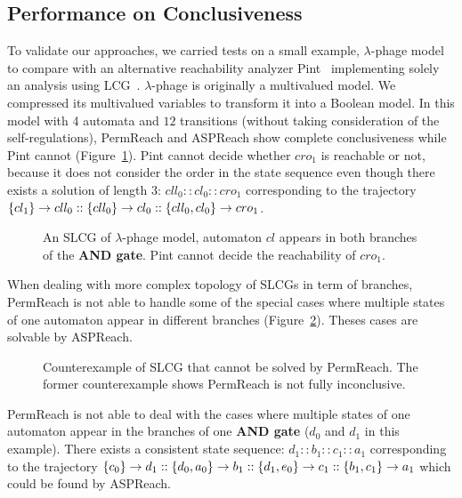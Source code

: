 \subsection{Performance on Conclusiveness}
To validate our approaches, we carried tests on a small example, $\lambda$-phage model~\cite{thieffry1995dynamical} to compare with an alternative reachability analyzer Pint~\cite{pauleve2012} implementing solely an analysis using LCG~\cite{pauleve2017reduction,folschette2015,pauleve2011}.
$\lambda$-phage is originally a multivalued model.
We compressed its multivalued variables to transform it into a Boolean model.
In this model with 4 automata and $12$ transitions (without taking consideration of the self-regulations),
PermReach and ASPReach show complete conclusiveness while Pint cannot (Figure~\ref{fig:LCG_lambdaPhage}). %
Pint cannot decide whether $cro_1$ is reachable or not, because it does not consider the order in the state sequence even though there exists a solution of length 3: $cll_0::cl_0::cro_1$ corresponding to the trajectory $\acm{cl_1}{cll_1}{cll_0}::\acm{cll_0}{cl_1}{cl_0}::\acm{cll_0,cl_0}{cro_0}{cro_1}$.
\begin{figure}[ht]
\centering
    
    \caption[SLCG of $\lambda$-phage model]{An SLCG of $\lambda$-phage model, automaton $cl$ appears in both branches of the \textbf{AND gate}.
    Pint cannot decide the reachability of $cro_1$.}
    \label{fig:LCG_lambdaPhage}
\end{figure}

When dealing with more complex topology of SLCGs in term of branches, PermReach is not able to handle some of the special cases where multiple states of one automaton appear in different branches (Figure~\ref{fig:countexPerm}).
Theses cases are solvable by \mbox{ASPReach}.

\begin{figure}[ht]
    \centering
    
    \caption[Counterexample of PermReach]{Counterexample of SLCG that cannot be solved by PermReach. The former counterexample shows PermReach is not fully inconclusive.}\label{fig:countexPerm}
\end{figure}

PermReach is not able to deal with the cases where multiple states of one automaton appear in the branches of one \textbf{AND gate} ($d_0$ and $d_1$ in this example).
There exists a consistent state sequence: $d_1::b_1::c_1::a_1$ corresponding to the trajectory $\acm{c_0}{d_0}{d_1}::\acm{d_0,a_0}{b_0}{b_1}::\acm{d_1,e_0}{c_0}{c_1}::\acm{b_1,c_1}{a_0}{a_1}$ which could be found by ASPReach.

